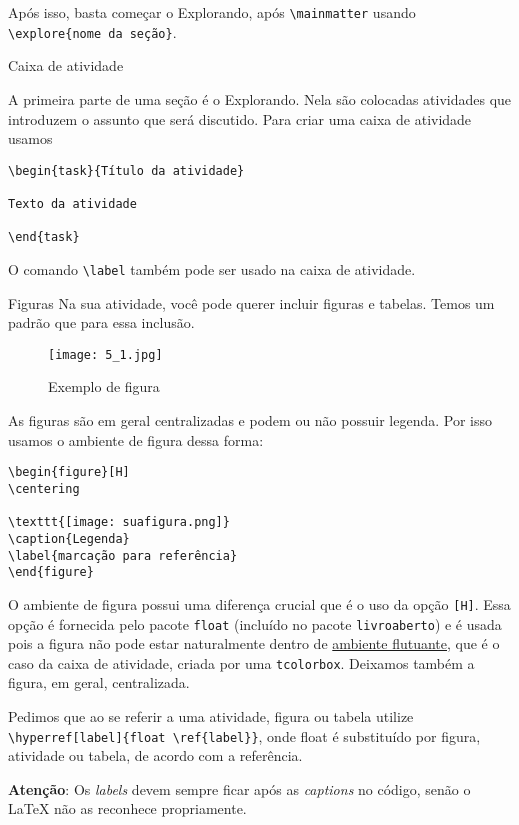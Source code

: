 Após isso, basta começar o Explorando, após \verb|\mainmatter| usando \verb|\explore{nome da seção}|.

\begin{task}{Caixa de atividade}

A primeira parte de uma seção é o Explorando. Nela são colocadas atividades que introduzem o assunto que será discutido. Para criar uma caixa de atividade usamos
\begin{verbatim}
\begin{task}{Título da atividade}

Texto da atividade

\end{task}
\end{verbatim} 

O comando \verb|\label| também pode ser usado na caixa de atividade.
\end{task}


\begin{task}{Figuras}
Na sua atividade, você pode querer incluir figuras e tabelas. Temos um padrão que para essa inclusão.

\begin{figure}[H]
\centering

\texttt{[image: 5\_1.jpg]}
\caption{Exemplo de figura}
\end{figure}

As figuras são em geral centralizadas e podem ou não possuir legenda. Por isso usamos o ambiente de figura dessa forma:

\begin{verbatim}
\begin{figure}[H]
\centering

\texttt{[image: suafigura.png]}
\caption{Legenda}
\label{marcação para referência}
\end{figure}
\end{verbatim}

O ambiente de figura possui uma diferença crucial que é o uso da opção \verb|[H]|. Essa opção é fornecida pelo pacote \verb|float| (incluído no pacote \verb|livroaberto|) e é usada pois a figura não pode estar naturalmente dentro de \href{https://en.wikibooks.org/wiki/LaTeX/Floats,_Figures_and_Captions}{ambiente flutuante}, que é o caso da caixa de atividade, criada por uma \verb|tcolorbox|. Deixamos também a figura, em geral, centralizada.

Pedimos que ao se referir a uma atividade, figura ou tabela utilize \verb|\hyperref[label]{float \ref{label}}|, onde float é substituído por figura, atividade ou tabela, de acordo com a referência. 

\textbf{Atenção}: Os \textit{labels} devem sempre ficar após as \textit{captions} no código, senão o \LaTeX{} não as reconhece propriamente.
\end{task}

